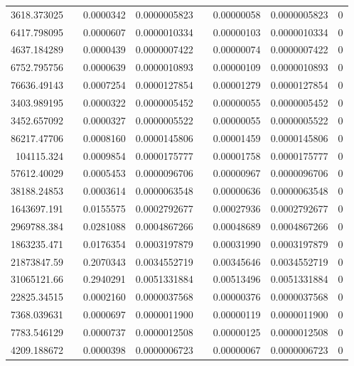 \documentclass[
journal=jacsat, %
manuscript=article]{achemso}
\begin{document}
\begin{table}[htbp]
{\begin{tabular}{rrrrrrrr}
    3618.373025 &       & 0.0000342 & 0.0000005823 &       & 0.00000058 & 0.0000005823 & 0 \\
    6417.798095 &       & 0.0000607 & 0.0000010334 &       & 0.00000103 & 0.0000010334 & 0 \\
    4637.184289 &       & 0.0000439 & 0.0000007422 &       & 0.00000074 & 0.0000007422 & 0 \\
    6752.795756 &       & 0.0000639 & 0.0000010893 &       & 0.00000109 & 0.0000010893 & 0 \\
    76636.49143 &       & 0.0007254 & 0.0000127854 &       & 0.00001279 & 0.0000127854 & 0 \\
    3403.989195 &       & 0.0000322 & 0.0000005452 &       & 0.00000055 & 0.0000005452 & 0 \\
    3452.657092 &       & 0.0000327 & 0.0000005522 &       & 0.00000055 & 0.0000005522 & 0 \\
    86217.47706 &       & 0.0008160 & 0.0000145806 &       & 0.00001459 & 0.0000145806 & 0 \\
    104115.324 &       & 0.0009854 & 0.0000175777 &       & 0.00001758 & 0.0000175777 & 0 \\
    57612.40029 &       & 0.0005453 & 0.0000096706 &       & 0.00000967 & 0.0000096706 & 0 \\
    38188.24853 &       & 0.0003614 & 0.0000063548 &       & 0.00000636 & 0.0000063548 & 0 \\
    1643697.191 &       & 0.0155575 & 0.0002792677 &       & 0.00027936 & 0.0002792677 & 0 \\
    2969788.384 &       & 0.0281088 & 0.0004867266 &       & 0.00048689 & 0.0004867266 & 0 \\
    1863235.471 &       & 0.0176354 & 0.0003197879 &       & 0.00031990 & 0.0003197879 & 0 \\
    21873847.59 &       & 0.2070343 & 0.0034552719 &       & 0.00345646 & 0.0034552719 & 0 \\
    31065121.66 &       & 0.2940291 & 0.0051331884 &       & 0.00513496 & 0.0051331884 & 0 \\
    22825.34515 &       & 0.0002160 & 0.0000037568 &       & 0.00000376 & 0.0000037568 & 0 \\
    7368.039631 &       & 0.0000697 & 0.0000011900 &       & 0.00000119 & 0.0000011900 & 0 \\
    7783.546129 &       & 0.0000737 & 0.0000012508 &       & 0.00000125 & 0.0000012508 & 0 \\
    4209.188672 &       & 0.0000398 & 0.0000006723 &       & 0.00000067 & 0.0000006723 & 0 \\

\end{tabular}}
\end{table}
\end{document}
